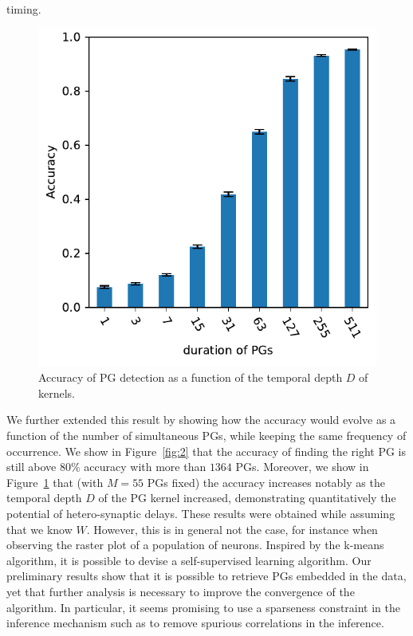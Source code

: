\documentclass[11pt]{article}
\begin{document}
timing.

\begin{figure}
\vspace{-10pt}
\includegraphics[width=\linewidth]{figure_N_PG_time.pdf}
\vspace{-25pt}
{
\caption{Accuracy of PG detection as a function of the temporal depth $D$ of kernels.
}
\label{fig:3}
}
\vspace{-15pt}
\end{figure}
We further extended this result by showing how the accuracy would evolve as a function of the number of simultaneous PGs, while keeping the same frequency of occurrence. We show in Figure~\ref{fig:2} that the accuracy of finding the right PG is still above $80\%$ accuracy with more than $1364$ PGs. Moreover, we show in Figure~\ref{fig:3} that (with $M=55$ PGs fixed) the accuracy increases notably as the temporal depth $D$ of the PG kernel increased, demonstrating quantitatively the potential of hetero-synaptic delays. These results were obtained while assuming that we know $W$. However, this is in general not the case, for instance when observing the raster plot of a population of neurons. Inspired by the k-means algorithm, it is possible to devise a self-supervised learning algorithm. Our preliminary results show that it is possible to retrieve PGs embedded in the data, yet that further analysis is necessary to improve the convergence of the algorithm. In particular, it seems promising to use a sparseness constraint in the inference mechanism such as to remove spurious correlations in the inference.
\end{document}
